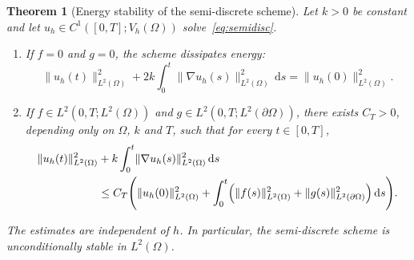 \documentclass[final,3p,times]{elsarticle}
\theoremstyle{plain}
\newtheorem{theorem}{Theorem}
\theoremstyle{definition}
\theoremstyle{remark}
\newcommand{\dd}{\mathrm{d}}
\begin{document}
\begin{theorem}[Energy stability of the semi-discrete scheme]
\label{thm:semi}
Let $k>0$ be constant and let $u_h\in C^1([0,T];V_h(\Omega))$
solve~\eqref{eq:semidisc}.
\begin{enumerate}
\item If $f=0$ and $g=0$, the scheme dissipates energy:
\begin{equation}
\label{eq:energy-hom}
\lVert u_h(t)\rVert_{L^2(\Omega)}^2
+2k\int_0^t\lVert\nabla u_h(s)\rVert_{L^2(\Omega)}^2\,\dd s
=
\lVert u_h(0)\rVert_{L^2(\Omega)}^2.
\end{equation}
\item If $f\in L^2(0,T;L^2(\Omega))$ and
$g\in L^2(0,T;L^2(\partial\Omega))$, there exists $C_T>0$, depending only
on $\Omega$, $k$ and $T$, such that for every $t\in[0,T]$,
\begin{equation}
\label{eq:energy}
\begin{aligned}
\lVert u_h(t)\rVert_{L^2(\Omega)}^2
&+k\int_0^t\lVert\nabla u_h(s)\rVert_{L^2(\Omega)}^2\,\dd s \\
&\le
C_T\Biggl(
\lVert u_h(0)\rVert_{L^2(\Omega)}^2
+\int_0^t\Bigl(
\lVert f(s)\rVert_{L^2(\Omega)}^2
+\lVert g(s)\rVert_{L^2(\partial\Omega)}^2
\Bigr)\,\dd s
\Biggr).
\end{aligned}
\end{equation}
\end{enumerate}
The estimates are independent of $h$. In particular, the semi-discrete
scheme is unconditionally stable in $L^2(\Omega)$.
\end{theorem}
\end{document}
